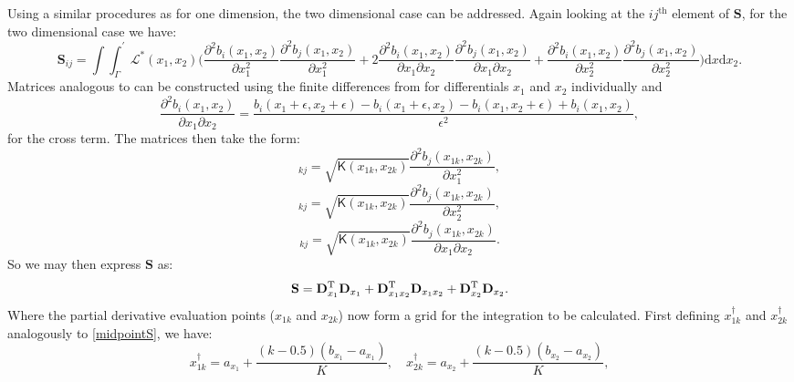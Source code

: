 Using a similar procedures as for one dimension, the two dimensional case can be addressed. Again looking at the $ij^\text{th}$ element of $\mathbf{S}$, for the two dimensional case we have:
\begin{equation*}
\mathbf{S}_{ij}=\int\int_\Gamma^\prime \mathcal{L}^*(x_1,x_2) \Big( \frac{\partial^2 b_i(x_1,x_2)}{\partial x_1^2}\frac{\partial^2 b_j(x_1,x_2)}{\partial x_1^2}+2\frac{\partial^2 b_i(x_1,x_2)}{\partial x_1 \partial x_2}\frac{\partial^2 b_j(x_1,x_2)}{\partial x_1 \partial x_2}+\frac{\partial^2 b_i(x_1,x_2)}{\partial x_2^2}\frac{\partial^2 b_j(x_1,x_2)}{\partial x_2^2} \Big) \text{d}x\text{d}x_2.
\end{equation*}
Matrices analogous to  can be constructed using the finite differences from  for differentials $x_1$ and $x_2$ individually and
\begin{equation*}
\frac{\partial^2 b_i(x_1,x_2)}{\partial x_1 \partial x_2} = \frac{ b_i(x_1+\epsilon,x_2+\epsilon) - b_i(x_1+\epsilon,x_2) - b_i(x_1,x_2+\epsilon) + b_i(x_1,x_2)}{\epsilon^2},
\end{equation*}
for the cross term. The matrices then take the form:
\begin{equation*}
[\mathbf{D}_{x_1}]_{kj}=\sqrt{\mathsf{K}(x_{1k},x_{2k})} \frac{\partial^2 b_j(x_{1k},x_{2k})}{\partial x_1^2},
\end{equation*}
\begin{equation*}
[\mathbf{D}_{x_2}]_{kj}=\sqrt{\mathsf{K}(x_{1k},x_{2k})} \frac{\partial^2 b_j(x_{1k},x_{2k})}{\partial x_2^2},
\end{equation*}
\begin{equation*}
[\mathbf{D}_{x_1 x_2}]_{kj}=\sqrt{\mathsf{K}(x_{1k},x_{2k})} \frac{\partial^2 b_j(x_{1k},x_{2k})}{\partial x_1 \partial x_2}.
\end{equation*}
So we may then express $\mathbf{S}$ as:
\begin{equation*}
\mathbf{S}=\mathbf{D}_{x_1}^{\text{T}}\mathbf{D}_{x_1} + \mathbf{D}_{x_1 x_2}^{\text{T}}\mathbf{D}_{x_1 x_2} + \mathbf{D}_{x_2}^{\text{T}}\mathbf{D}_{x_2}.
\end{equation*}
Where the partial derivative evaluation points ($x_{1k}$ and $x_{2k}$) now form a grid for the integration to be calculated. First defining $x^\dagger_{1k}$ and $x^\dagger_{2k}$ analogously to \ref{midpointS}, we have:
\begin{equation*}
x^\dagger_{1k}=a_{x_1}+\frac{(k-0.5)(b_{x_1}-a_{x_1})}{K},\quad
x^\dagger_{2k}=a_{x_2}+\frac{(k-0.5)(b_{x_2}-a_{x_2})}{K},
\end{equation*}
